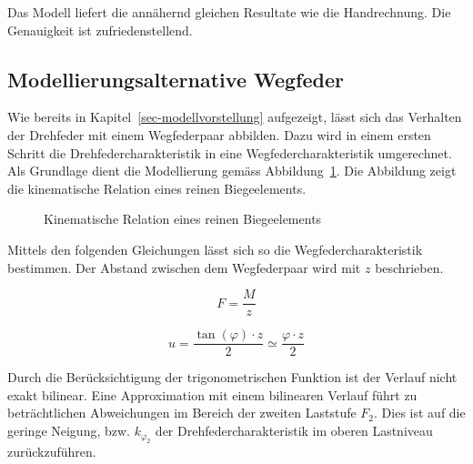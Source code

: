 \documentclass[
  11pt,
  letterpaper,
]{scrreprt}
\begin{document}
Das Modell liefert die annähernd gleichen Resultate wie die
Handrechnung. Die Genauigkeit ist zufriedenstellend.

\subsection{Modellierungsalternative
Wegfeder}\label{modellierungsalternative-wegfeder}

Wie bereits in Kapitel~\ref{sec-modellvorstellung} aufgezeigt, lässt
sich das Verhalten der Drehfeder mit einem Wegfederpaar abbilden. Dazu
wird in einem ersten Schritt die Drehfedercharakteristik in eine
Wegfedercharakteristik umgerechnet. Als Grundlage dient die Modellierung
gemäss Abbildung~\ref{fig-verdrehung_verformung}. Die Abbildung zeigt
die kinematische Relation eines reinen Biegeelements.

\begin{figure}[H]


\caption{\label{fig-verdrehung_verformung}Kinematische Relation eines
reinen Biegeelements}

\end{figure}%

Mittels den folgenden Gleichungen lässt sich so die
Wegfedercharakteristik bestimmen. Der Abstand zwischen dem Wegfederpaar
wird mit \(z\) beschrieben.

\[
F = \frac{M}{z}
\]

\[
u = \frac{\tan(\varphi) \cdot z}{2} \simeq \frac{\varphi \cdot z}{2}
\]

Durch die Berücksichtigung der trigonometrischen Funktion ist der
Verlauf nicht exakt bilinear. Eine Approximation mit einem bilinearen
Verlauf führt zu beträchtlichen Abweichungen im Bereich der zweiten
Laststufe \(F_2\). Dies ist auf die geringe Neigung, bzw.
\(k_{\varphi_2}\) der Drehfedercharakteristik im oberen Lastniveau
zurückzuführen.
\end{document}
